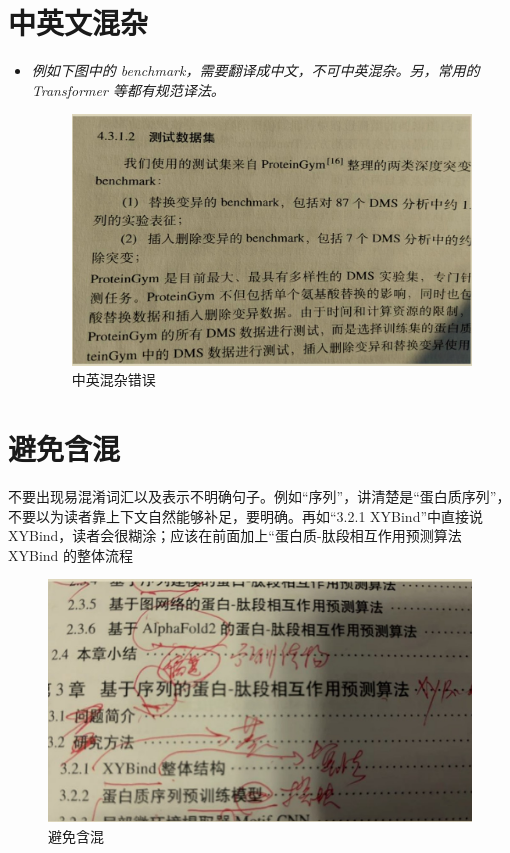 \section{中英文混杂}
\begin{itemize}
\item \emph{例如下图中的 benchmark，需要翻译成中文，不可中英混杂。另，常用的 Transformer 等都有规范译法。}
\begin{figure}[!htpb]
\centering
\includegraphics[scale=0.65]{doc/figures/chk04.jpg}
\caption{中英混杂错误}
\label{fig:mix-zh-cn-en-error}
\end{figure}
\end{itemize}




\section{避免含混}
不要出现易混淆词汇以及表示不明确句子。例如“序列”，讲清楚是“蛋白质序列”，不要以为读者靠上下文自然能够补足，要明确。再如“3.2.1 XYBind”中直接说 XYBind，读者会很糊涂；应该在前面加上“蛋白质-肽段相互作用预测算法 XYBind 的整体流程

\begin{figure}[!htpb]
\centering
\includegraphics[scale=0.65]{doc/figures/chk06.jpg}
\caption{避免含混}
\label{fig:unclear-meanning}
\end{figure}


